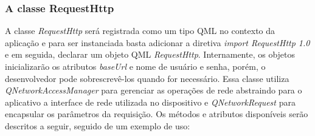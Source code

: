 \subsubsection{A classe RequestHttp}\label{sec:solucao-desenvolvida}
A classe \textit{RequestHttp} será registrada como um tipo QML no contexto da aplicação e para ser instanciada basta adicionar a diretiva \textit{import RequestHttp 1.0} e em seguida, declarar um objeto QML \textit{RequestHttp}. Internamente, os objetos inicializarão os atributos \textit{baseUrl} e nome de usuário e senha, porém, o desenvolvedor pode sobrescrevê-los quando for necessário. Essa classe utiliza \textit{QNetworkAccessManager} para gerenciar as operações de rede abstraindo para o aplicativo a interface de rede utilizada no dispositivo e \textit{QNetworkRequest} para encapsular os parâmetros da requisição. Os métodos e atributos disponíveis serão descritos a seguir, seguido de um exemplo de uso:

